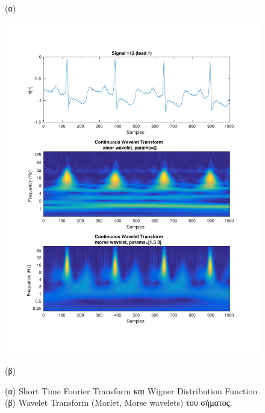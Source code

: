 \documentclass[11pt,a4paper]{article}
\begin{document}
\begin{figure}[H]
\begin{minipage}{0.48\textwidth}
	(α)
\end{minipage}
\begin{minipage}{0.48\textwidth}
	\centering
	\includegraphics[width=\textwidth]{fig/112l1_cwt.pdf}
	
	(β)
\end{minipage}
\vfill
\caption{(α) Short Time Fourier Transform και Wigner Distribution Function (β) Wavelet Transform (Morlet, Morse wavelets) του σήματος.}
\label{fig:112l1_stft_wdf_wt}
\end{figure}
\end{document}
